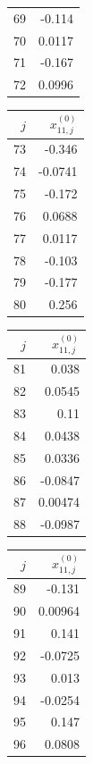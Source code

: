 {\begin{tabular}[t]{r|r}
69 & -0.114 \\
70 & 0.0117 \\
71 & -0.167 \\
72 & 0.0996
\end{tabular}\kern4pt
\begin{tabular}[t]{r|r}
$j$ & $x^{(0)}_{11,j}$ \\\hline
73 & -0.346 \\
74 & -0.0741 \\
75 & -0.172 \\
76 & 0.0688 \\
77 & 0.0117 \\
78 & -0.103 \\
79 & -0.177 \\
80 & 0.256
\end{tabular}\kern4pt
\begin{tabular}[t]{r|r}
$j$ & $x^{(0)}_{11,j}$ \\\hline
81 & 0.038 \\
82 & 0.0545 \\
83 & 0.11 \\
84 & 0.0438 \\
85 & 0.0336 \\
86 & -0.0847 \\
87 & 0.00474 \\
88 & -0.0987
\end{tabular}\kern4pt
\begin{tabular}[t]{r|r}
$j$ & $x^{(0)}_{11,j}$ \\\hline
89 & -0.131 \\
90 & 0.00964 \\
91 & 0.141 \\
92 & -0.0725 \\
93 & 0.013 \\
94 & -0.0254 \\
95 & 0.147 \\
96 & 0.0808
\end{tabular}}

